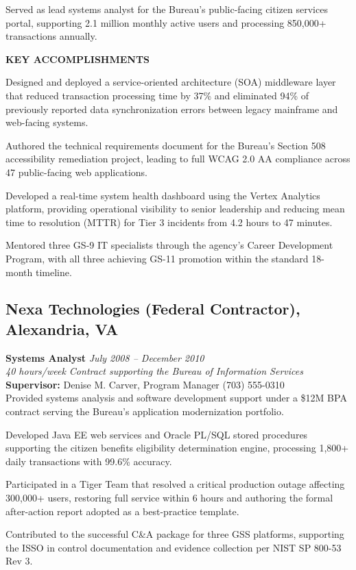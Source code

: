 \documentclass[11pt,letterpaper]{article}
\newcommand{\dutysection}[1]{%
  \par\vspace{6pt}\noindent\textbf{\footnotesize\color{Navy}\MakeUppercase{#1}}\par\vspace{2pt}%
}
\begin{document}
Served as lead systems analyst for the Bureau's public-facing citizen services portal, supporting 2.1 million monthly active users and processing 850,000+ transactions annually.

\dutysection{Key Accomplishments}
\begin{dutylist}
  \item Designed and deployed a service-oriented architecture (SOA) middleware layer that reduced transaction processing time by 37\% and eliminated 94\% of previously reported data synchronization errors between legacy mainframe and web-facing systems.
  \item Authored the technical requirements document for the Bureau's Section 508 accessibility remediation project, leading to full WCAG 2.0 AA compliance across 47 public-facing web applications.
  \item Developed a real-time system health dashboard using the Vertex Analytics platform, providing operational visibility to senior leadership and reducing mean time to resolution (MTTR) for Tier 3 incidents from 4.2 hours to 47 minutes.
  \item Mentored three GS-9 IT specialists through the agency's Career Development Program, with all three achieving GS-11 promotion within the standard 18-month timeline.
\end{dutylist}

\subsection{Nexa Technologies (Federal Contractor), Alexandria, VA}
\noindent\textbf{Systems Analyst} \hfill \small\textit{July 2008 -- December 2010}\\[2pt]
\noindent\small\textit{40 hours/week {\textbar} Contract supporting the Bureau of Information Services}\\[2pt]
\noindent\small\textbf{Supervisor:} Denise M. Carver, Program Manager \hfill (703) 555-0310\\[6pt]

Provided systems analysis and software development support under a \$12M BPA contract serving the Bureau's application modernization portfolio.

\begin{dutylist}
  \item Developed Java EE web services and Oracle PL/SQL stored procedures supporting the citizen benefits eligibility determination engine, processing 1,800+ daily transactions with 99.6\% accuracy.
  \item Participated in a Tiger Team that resolved a critical production outage affecting 300,000+ users, restoring full service within 6 hours and authoring the formal after-action report adopted as a best-practice template.
  \item Contributed to the successful C\&A package for three GSS platforms, supporting the ISSO in control documentation and evidence collection per NIST SP 800-53 Rev 3.
\end{dutylist}
\end{document}
